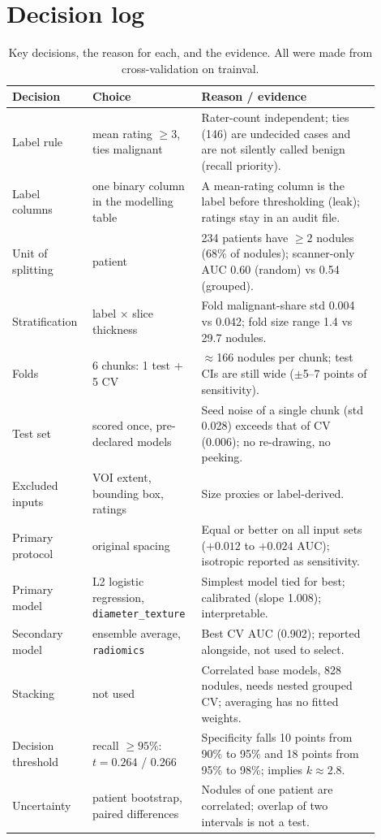 \documentclass[journal]{IEEEtran}
\newcommand{\auc}{\mathrm{AUC}}
\newcommand{\code}[1]{\texttt{#1}}
\begin{document}
\section{Decision log}
\label{app:decisions}
\begin{table}[!t]
\caption{Key decisions, the reason for each, and the evidence. All were made from cross-validation on trainval.}
\centering\small
\begin{tabular}{p{0.19\linewidth}p{0.25\linewidth}p{0.46\linewidth}}
\toprule
Decision & Choice & Reason / evidence\\
\midrule
Label rule & mean rating $\geq3$, ties malignant & Rater-count independent; ties (146) are undecided cases and are not silently called benign (recall priority).\\
Label columns & one binary column in the modelling table & A mean-rating column is the label before thresholding (leak); ratings stay in an audit file.\\
Unit of splitting & patient & 234 patients have $\geq2$ nodules (68\% of nodules); scanner-only $\auc$ 0.60 (random) vs 0.54 (grouped).\\
Stratification & label $\times$ slice thickness & Fold malignant-share std 0.004 vs 0.042; fold size range 1.4 vs 29.7 nodules.\\
Folds & 6 chunks: 1 test + 5 CV & $\approx$166 nodules per chunk; test CIs are still wide ($\pm$5--7 points of sensitivity).\\
Test set & scored once, pre-declared models & Seed noise of a single chunk (std 0.028) exceeds that of CV (0.006); no re-drawing, no peeking.\\
Excluded inputs & VOI extent, bounding box, ratings & Size proxies or label-derived.\\
Primary protocol & original spacing & Equal or better on all input sets ($+0.012$ to $+0.024$ $\auc$); isotropic reported as sensitivity.\\
Primary model & L2 logistic regression, \code{diameter\_texture} & Simplest model tied for best; calibrated (slope 1.008); interpretable.\\
Secondary model & ensemble average, \code{radiomics} & Best CV $\auc$ (0.902); reported alongside, not used to select.\\
Stacking & not used & Correlated base models, 828 nodules, needs nested grouped CV; averaging has no fitted weights.\\
Decision threshold & recall $\geq95\%$: $t=0.264$ / 0.266 & Specificity falls 10 points from 90\% to 95\% and 18 points from 95\% to 98\%; implies $k\approx2.8$.\\
Uncertainty & patient bootstrap, paired differences & Nodules of one patient are correlated; overlap of two intervals is not a test.\\
\bottomrule
\end{tabular}
\end{table}
\end{document}
